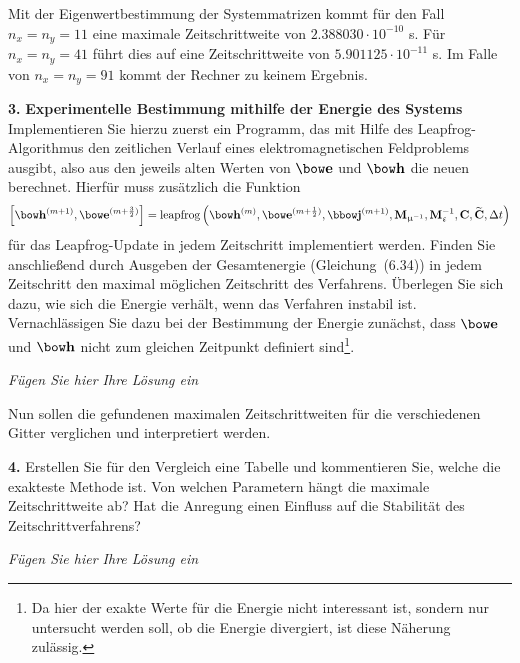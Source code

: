 \documentclass[Protokollheft.tex]{subfiles}
\begin{document}
Mit der Eigenwertbestimmung der Systemmatrizen kommt für den Fall $n_x=n_y =11$ eine maximale Zeitschrittweite von $2.388030 \cdot 10^{-10}$ s. Für $n_x=n_y=41$ führt dies auf eine Zeitschrittweite von $5.901125\cdot 10^{-11} $ s. Im Falle von $n_x=n_y=91$ kommt der Rechner zu keinem Ergebnis. 

\begin{framed}
	\noindent \textbf{3.} \textbf{Experimentelle Bestimmung mithilfe der Energie des Systems}\\
Implementieren Sie hierzu zuerst ein Programm, das mit Hilfe des Leapfrog-Algorithmus den
zeitlichen Verlauf eines elektromagnetischen Feldproblems ausgibt,
also aus den jeweils alten Werten von $\efit$ und $\hfit$ die neuen
berechnet. Hierfür muss zusätzlich die Funktion
\begin{align}
    \left[\hfit^{(m+1)},\efit^{(m+\frac{3}{2})}\right]= {\text{leapfrog}}
	\left(\hfit^{(m)},\efit^{(m+\frac{1}{2})},\jfit^{(m+1)},\Mmui,\Meps^{-1},\curlfit,\curldfit,\Delta t \right)
\end{align}
für das Leapfrog-Update in jedem Zeitschritt implementiert werden.
Finden Sie anschließend durch Ausgeben der Gesamtenergie (Gleichung~(6.34))
in jedem Zeitschritt den maximal möglichen Zeitschritt des Verfahrens.
Überlegen Sie sich dazu, wie sich die Energie verhält, wenn das Verfahren instabil ist.
Vernachlässigen Sie dazu bei der Bestimmung der Energie zunächst, dass $\efit$
und $\hfit$ nicht zum gleichen Zeitpunkt definiert sind\footnote{Da
hier der exakte Werte für die Energie nicht interessant ist,
sondern nur untersucht werden soll, ob die Energie divergiert, ist
diese Näherung zulässig.}.\label{exer:calcDeltaTmaxWithEnergy}
\end{framed}

\emph{Fügen Sie hier Ihre Lösung ein}

\noindent Nun sollen die gefundenen maximalen Zeitschrittweiten für die verschiedenen Gitter verglichen und interpretiert werden.

\begin{framed}
	\noindent \textbf{4.} Erstellen Sie für den Vergleich eine Tabelle und kommentieren Sie, welche die exakteste Methode ist. Von welchen Parametern hängt die maximale Zeitschrittweite ab? Hat die Anregung einen Einfluss auf die Stabilität des Zeitschrittverfahrens?\label{exer:compareMethods4deltaTmax}
\end{framed}

\emph{Fügen Sie hier Ihre Lösung ein}
\end{document}
